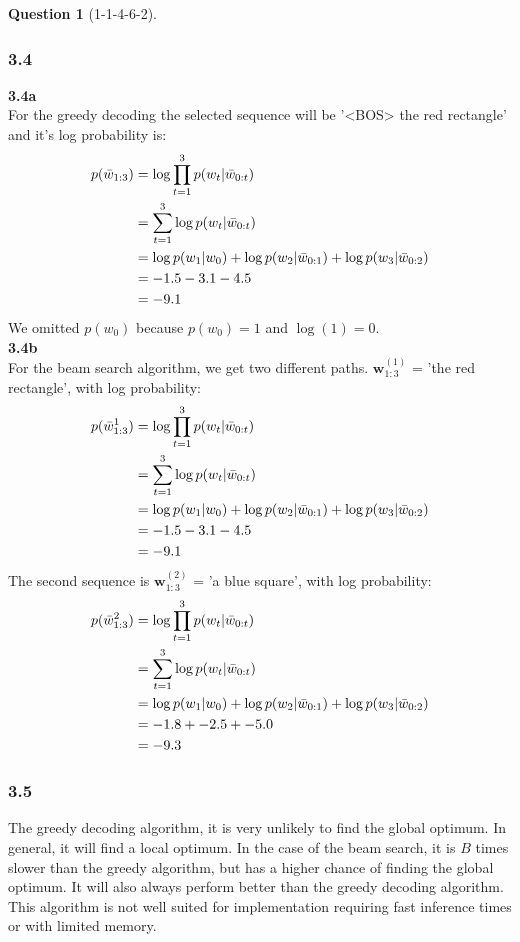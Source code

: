 \documentclass[12pt]{article}
\theoremstyle{definition}
\newtheorem{exercise}{Question}%
\begin{document}
\begin{exercise}[1-1-4-6-2]
{    \subsubsection*{3.4}
    \textbf{3.4a}
    \\
    For the greedy decoding the selected sequence will be '<BOS> the red rectangle' and it's
    log probability is:
    \begin{align*}
      p(\bar{w}_{1:3}) &= \log \prod_{t=1}^{3} p(w_{t}| \boldmath{\bar{w}}_{0:t}) \\
      &=\sum_{t=1}^{3} \log p(w_{t}| \boldmath{\bar{w}}_{0:t}) \\
      &= \log p(w_{1}| w_{0})+\log p(w_{2}| \bar{w}_{0:1})+\log p(w_{3}| \bar{ w }_{0:2})\\
      &= -1.5 -3.1 -4.5 \\
      &= -9.1
    \end{align*}We omitted $p(w_{0})$ because $p(w_{0})=1$ and $\log (1)=0$.
    \\
    \textbf{3.4b}
    \\
    For the beam search algorithm, we get two different paths.
    $\mathbf{w}_{1:3}^{(1)}$ = 'the red rectangle', with log probability:
    \begin{align*}
      p(\bar{w}_{1:3}^{1}) &= \log \prod_{t=1}^{3} p(w_{t}| \boldmath{\bar{w}}_{0:t}) \\
      &=\sum_{t=1}^{3} \log p(w_{t}| \boldmath{\bar{w}}_{0:t}) \\
      &= \log p(w_{1}| w_{0})+\log p(w_{2}| \bar{w}_{0:1})+\log p(w_{3}| \bar{ w }_{0:2})\\
      &= -1.5 -3.1 -4.5 \\
      &= -9.1
    \end{align*}
    The second sequence is $\mathbf{w}_{1:3}^{(2)}$ = 'a blue square', with log probability:
    \begin{align*}
      p(\bar{w}_{1:3}^{2}) &= \log \prod_{t=1}^{3} p(w_{t}| \boldmath{\bar{w}}_{0:t}) \\
      &=\sum_{t=1}^{3} \log p(w_{t}| \boldmath{\bar{w}}_{0:t}) \\
      &= \log p(w_{1}| w_{0})+\log p(w_{2}| \bar{w}_{0:1})+\log p(w_{3}| \bar{ w }_{0:2})\\
      &= -1.8 + -2.5 + -5.0\\
      &= -9.3
    \end{align*}
    \subsubsection*{3.5}
    The greedy decoding algorithm, it is very unlikely to find the global
    optimum. In general, it will find a local optimum. In the case of the beam
    search, it is $B$ times slower than the greedy algorithm, but has a higher
    chance of finding the global optimum. It will also always perform better
    than the greedy decoding algorithm. This algorithm is not well suited for
    implementation requiring fast inference times or with limited memory.
    }
\end{exercise}
\end{document}
